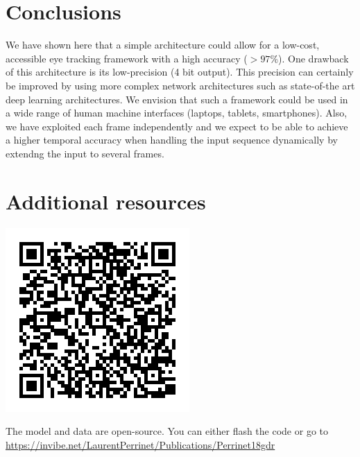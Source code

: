 \documentclass[a0,portrait]{a0poster}
\begin{document}
\begin{multicols}{3} %
\color{Navy} %

\section*{Conclusions}
We have shown here that a simple architecture could allow for a low-cost, accessible eye tracking framework with a high accuracy ($>97\%$). One drawback of this architecture is its low-precision (4 bit output). This precision can certainly be improved by using more complex network architectures such as state-of-the art deep learning architectures. We envision that such a framework could be used in a wide range of human machine interfaces (laptops, tablets, smartphones). Also, we have exploited each frame independently and we expect to be able to achieve a higher temporal accuracy when handling the input sequence dynamically by extendng the input to several frames.

\color{Black} %

\section*{Additional resources}

\begin{minipage}{0.3\linewidth}
\includegraphics[width=1.\linewidth]{GitQR.png}
\end{minipage}\hfil
\begin{minipage}{0.67\linewidth}
The model and data are open-source. You can either flash the code or go to \url{https://invibe.net/LaurentPerrinet/Publications/Perrinet18gdr}
\end{minipage}

\end{multicols}
\end{document}
